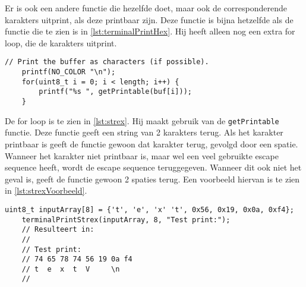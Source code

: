 Er is ook een andere functie die hezelfde doet, maar ook de corresponderende karakters uitprint, als deze printbaar zijn. Deze functie is bijna hetzelfde als de functie die te zien is in \autoref{lst:terminalPrintHex}. Hij heeft alleen nog een extra for loop, die de karakters uitprint.

\begin{lstlisting}[caption={De corresponderende karakters naar de terminal printen, mits ze printbaar zijn},captionpos=b,label={lst:strex},style=c,xleftmargin=.\textwidth,xrightmargin=.\textwidth]
    // Print the buffer as characters (if possible).
    printf(NO_COLOR "\n");
    for(uint8_t i = 0; i < length; i++) {
        printf("%s ", getPrintable(buf[i]));
    }
\end{lstlisting}

De for loop is te zien in \autoref{lst:strex}. Hij maakt gebruik van de \texttt{getPrintable} functie. Deze functie geeft een string van 2 karakters terug. Als het karakter printbaar is geeft de functie gewoon dat karakter terug, gevolgd door een spatie. Wanneer het karakter niet printbaar is, maar wel een veel gebruikte escape sequence heeft, wordt de escape sequence teruggegeven. Wanneer dit ook niet het geval is, geeft de functie gewoon 2 spaties terug.
Een voorbeeld hiervan is te zien in \autoref{lst:strexVoorbeeld}.

\begin{lstlisting}[caption={Een voorbeeld van het gebruik van de \texttt{terminalPrintStrex} functie},captionpos=b,label={lst:strexVoorbeeld},style=c,xleftmargin=.\textwidth,xrightmargin=.\textwidth]
    uint8_t inputArray[8] = {'t', 'e', 'x' 't', 0x56, 0x19, 0x0a, 0xf4};
    terminalPrintStrex(inputArray, 8, "Test print:");
    // Resulteert in:
    //
    // Test print: 
    // 74 65 78 74 56 19 0a f4
    // t  e  x  t  V     \n   
    // 
\end{lstlisting}
